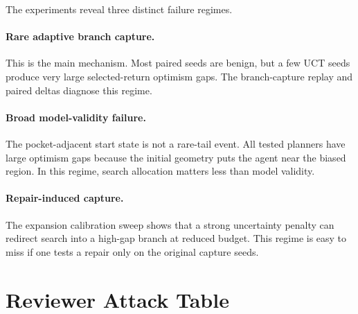 \documentclass{article}
\begin{document}
The experiments reveal three distinct failure regimes.

\paragraph{Rare adaptive branch capture.}
This is the main mechanism. Most paired seeds are benign, but a few UCT seeds produce very large selected-return optimism gaps. The branch-capture replay and paired deltas diagnose this regime.

\paragraph{Broad model-validity failure.}
The pocket-adjacent start state is not a rare-tail event. All tested planners have large optimism gaps because the initial geometry puts the agent near the biased region. In this regime, search allocation matters less than model validity.

\paragraph{Repair-induced capture.}
The expansion calibration sweep shows that a strong uncertainty penalty can redirect search into a high-gap branch at reduced budget. This regime is easy to miss if one tests a repair only on the original capture seeds.

\section{Reviewer Attack Table}
\end{document}
